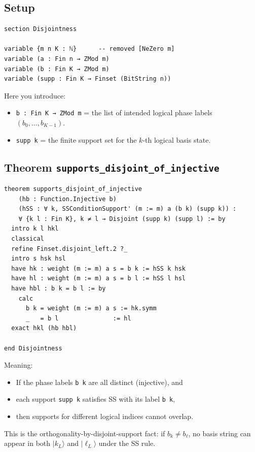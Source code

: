 \documentclass[11pt]{article}
\newcommand{\ket}[1]{\lvert #1 \rangle}
\begin{document}
\subsection*{Setup}

\begin{lstlisting}
section Disjointness

variable {m n K : ℕ}      -- removed [NeZero m]
variable (a : Fin n → ZMod m)
variable (b : Fin K → ZMod m)
variable (supp : Fin K → Finset (BitString n))
\end{lstlisting}

Here you introduce:
\begin{itemize}
\item \texttt{b : Fin K → ZMod m} = the list of intended logical phase labels $(b_0,\dots,b_{K-1})$.
\item \texttt{supp k} = the finite support set for the $k$-th logical basis state.
\end{itemize}

\subsection*{Theorem \texttt{supports\_disjoint\_of\_injective}}

\begin{lstlisting}
theorem supports_disjoint_of_injective
    (hb : Function.Injective b)
    (hSS : ∀ k, SSConditionSupport' (m := m) a (b k) (supp k)) :
    ∀ {k l : Fin K}, k ≠ l → Disjoint (supp k) (supp l) := by
  intro k l hkl
  classical
  refine Finset.disjoint_left.2 ?_
  intro s hsk hsl
  have hk : weight (m := m) a s = b k := hSS k hsk
  have hl : weight (m := m) a s = b l := hSS l hsl
  have hbl : b k = b l := by
    calc
      b k = weight (m := m) a s := hk.symm
      _   = b l               := hl
  exact hkl (hb hbl)

end Disjointness
\end{lstlisting}

Meaning:
\begin{itemize}
\item If the phase labels \texttt{b k} are all distinct (injective), and
\item each support \texttt{supp k} satisfies SS with its label \texttt{b k},
\item then supports for different logical indices cannot overlap.
\end{itemize}

This is the orthogonality-by-disjoint-support fact: if $b_k\neq b_\ell$, no basis string can appear in both
$\ket{k_L}$ and $\ket{\ell_L}$ under the SS rule.
\end{document}
